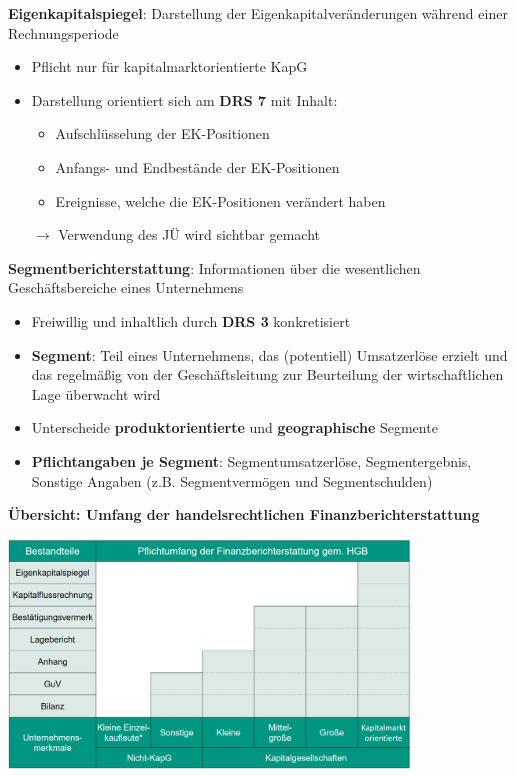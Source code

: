 \textbf{Eigenkapitalspiegel}: Darstellung der Eigenkapitalveränderungen während einer Rechnungsperiode
\begin{itemize}
	\item Pflicht nur für kapitalmarktorientierte KapG
	\item Darstellung orientiert sich am \textbf{DRS 7} mit Inhalt:
	\begin{itemize}
		\item Aufschlüsselung der EK-Positionen
		\item Anfangs- und Endbestände der EK-Positionen
		\item Ereignisse, welche die EK-Positionen verändert haben
	\end{itemize}
	$\rightarrow$ Verwendung des JÜ wird sichtbar gemacht
\end{itemize}

\textbf{Segmentberichterstattung}: Informationen über die wesentlichen Geschäftsbereiche eines Unternehmens
\begin{itemize}
	\item Freiwillig und inhaltlich durch \textbf{DRS 3} konkretisiert
	\item \textbf{Segment}: Teil eines Unternehmens, das (potentiell) Umsatzerlöse erzielt und
	das regelmäßig von der Geschäftsleitung zur Beurteilung der wirtschaftlichen Lage überwacht wird
	\item Unterscheide \textbf{produktorientierte} und \textbf{geographische} Segmente
	\item \textbf{Pflichtangaben je Segment}: Segmentumsatzerlöse, Segmentergebnis, Sonstige Angaben (z.B. Segmentvermögen und Segmentschulden)
\end{itemize}

\textbf{Übersicht: Umfang der handelsrechtlichen Finanzberichterstattung}
\begin{center}
	\includegraphics[width=0.8\textwidth]{images/sum.png}
\end{center}